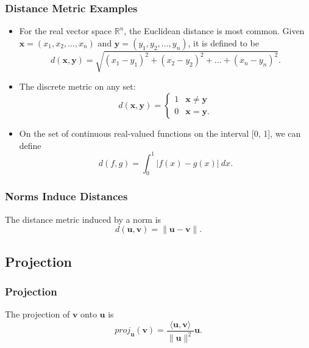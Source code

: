 \documentclass{beamer}
\begin{document}
\begin{frame}
\frametitle{Distance Metric Examples}

\begin{itemize}
\item For the real vector space $\mathbb{R}^n$, the Euclidean distance is most common. Given ${\boldsymbol x} = \left(x_1, x_2, \ldots, x_n\right)$ and ${\boldsymbol y} = (y_1, y_2, \ldots, y_n)$, it is defined to be
$$
d({\boldsymbol x}, {\boldsymbol y})= \sqrt{(x_1 - y_1)^2 + (x_2 - y_2)^2 +\ldots + (x_n -y_n)^2}.
$$
\item The discrete metric on any set:
$$
d({\boldsymbol x}, {\boldsymbol y}) = \begin{cases} 1	&	{\boldsymbol x} \neq {\boldsymbol y} \\ 0	&	{\boldsymbol x} = {\boldsymbol y}.\end{cases}
$$
\item On the set of continuous real-valued functions on the interval [0, 1], we can define
$$
d(f, g) = \int_0^1 \left| f(x) - g(x)\right|\ dx.
$$
\end{itemize}

\end{frame}

\begin{frame}
\frametitle{Norms Induce Distances}
The distance metric induced by a norm is
$$
d({\boldsymbol u}, {\boldsymbol v}) = \| {\boldsymbol u} - {\boldsymbol v}\|.
$$
\end{frame}

\subsection{Projection}

\begin{frame}[t]
\frametitle{Projection}
The projection of ${\boldsymbol v}$ onto ${\boldsymbol u}$ is
$$
proj_{\boldsymbol u}({\boldsymbol v}) = \frac{\langle {\boldsymbol u}, {\boldsymbol v} \rangle}{\| {\boldsymbol u}\|^2} {\boldsymbol u}.
$$
\begin{figure}
\centering
{}
\end{figure}
\end{frame}
\end{document}

